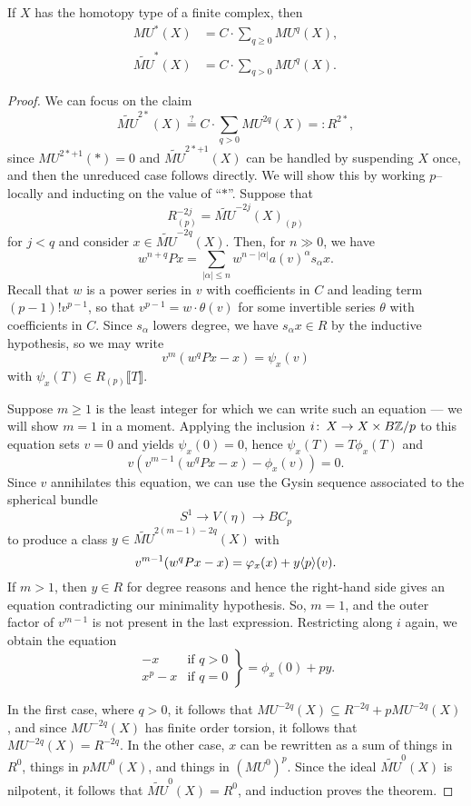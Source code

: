 \begin{theorem}
If $X$ has the homotopy type of a finite complex, then
\begin{align*}
MU^*(X) & = C \cdot \sum_{q \ge 0} MU^q(X), \\
\widetilde{MU}^*(X) & = C \cdot \sum_{q > 0} MU^q(X).
\end{align*}
\end{theorem}
\begin{proof}
We can focus on the claim \[\widetilde{MU}^{2*}(X) \stackrel{?}{=} C \cdot \sum_{q > 0} MU^{2q}(X) =: R^{2*},\] since $MU^{2*+1}(*) = 0$ and $\widetilde{MU}^{2*+1}(X)$ can be handled by suspending $X$ once, and then the unreduced case follows directly.  We will show this by working $p$--locally and inducting on the value of ``$*$''.  Suppose that \[R^{-2j}_{(p)} = \widetilde{MU}^{-2j}(X)_{(p)}\] for $j < q$ and consider $x \in \widetilde{MU}^{-2q}(X)$.  Then, for $n \gg 0$, we have \[w^{n+q} P x = \sum_{|\alpha| \le n} w^{n - |\alpha|} a(v)^\alpha s_\alpha x.\]  Recall that $w$ is a power series in $v$ with coefficients in $C$ and leading term $(p-1)! v^{p-1}$, so that $v^{p-1} = w \cdot \theta(v)$ for some invertible series $\theta$ with coefficients in $C$.  Since $s_\alpha$ lowers degree, we have $s_\alpha x \in R$ by the inductive hypothesis, so we may write \[v^m(w^qPx - x) = \psi_x(v)\] with $\psi_x(T) \in R_{(p)}\llbracket T \rrbracket$.

Suppose $m \ge 1$ is the least integer for which we can write such an equation --- we will show $m = 1$ in a moment.  Applying the inclusion $i\colon\thinspace X \to X \times B\mathbb Z/p$ to this equation sets $v = 0$ and yields $\psi_x(0) = 0$, hence $\psi_x(T) = T \phi_x(T)$ and \[v (v^{m-1}(w^qPx - x) - \phi_x(v)) = 0.\]  Since $v$ annihilates this equation, we can use the Gysin sequence associated to the spherical bundle \[S^1 \to V(\eta) \to BC_p\] to produce a class $y \in \widetilde{MU}^{2(m-1)-2q}(X)$ with \[v^{m-1}(w^q P x - x) = \varphi_x(x) + y \langle p\rangle(v).\]  If $m > 1$, then $y \in R$ for degree reasons and hence the right-hand side gives an equation contradicting our minimality hypothesis.  So, $m = 1$, and the outer factor of $v^{m-1}$ is not present in the last expression.  Restricting along $i$ again, we obtain the equation \[\left. \begin{array}{rr} -x & \text{if $q > 0$} \\ x^p - x & \text{if $q = 0$} \end{array} \right\} = \phi_x(0) + py.\]

In the first case, where $q > 0$, it follows that $MU^{-2q}(X) \subseteq R^{-2q} + pMU^{-2q}(X)$, and since $MU^{-2q}(X)$ has finite order torsion, it follows that $MU^{-2q}(X) = R^{-2q}$.  In the other case, $x$ can be rewritten as a sum of things in $R^{0}$, things in $p MU^{0}(X)$, and things in $(MU^0)^p$.  Since the ideal $\widetilde{MU}^0(X)$ is nilpotent, it follows that $\widetilde{MU}^0(X) = R^0$, and induction proves the theorem.
\end{proof}

